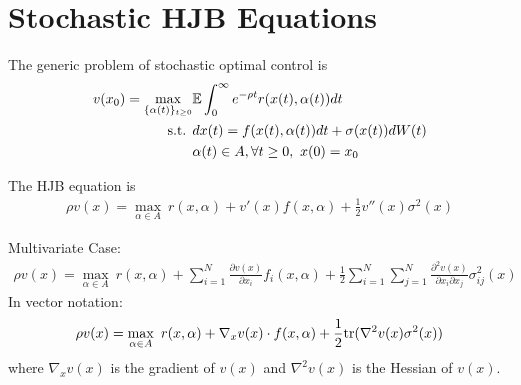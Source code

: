 \documentclass[11pt]{elegantbook}
\begin{document}
\section{Stochastic HJB Equations}
The generic problem of stochastic optimal control is
\begin{equation}
    \begin{aligned}
        v(x_0)=\max_{\{\alpha(t)\}_{t\geq 0}}&\mathbb{E}\int_0^{\infty}e^{-\rho t}r(x(t),\alpha(t))dt\\
        \textnormal{s.t. }& dx(t)=f(x(t),\alpha(t))dt+\sigma(x(t))dW(t)\\
        & \alpha(t)\in A,\forall t\geq 0,\ x(0)=x_0
    \end{aligned}
    \nonumber
\end{equation}
\begin{proposition}
    The HJB equation is
    \begin{equation}
        \begin{aligned}
            \rho v(x) = \max_{\alpha\in A}\ r(x,\alpha) + v'(x)f(x,\alpha) + \frac{1}{2}v''(x)\sigma^2(x)
        \end{aligned}
        \nonumber
    \end{equation}
\end{proposition}
Multivariate Case:
\begin{equation}
    \begin{aligned}
        \rho v(x) = \max_{\alpha\in A}\ r(x,\alpha) + \sum_{i=1}^N \frac{\partial v(x)}{\partial x_i} f_i(x,\alpha) + \frac{1}{2}\sum_{i=1}^N\sum_{j=1}^N \frac{\partial^2 v(x)}{\partial x_i \partial x_j} \sigma_{ij}^2(x)
    \end{aligned}
    \nonumber
\end{equation}
In vector notation:
\begin{equation}
    \begin{aligned}
        \rho v(x) = \max_{\alpha\in A}\ r(x,\alpha) + \nabla_x v(x) \cdot f(x,\alpha) + \frac{1}{2}\textnormal{tr}(\nabla^2v(x)\sigma^2(x))
    \end{aligned}
    \nonumber
\end{equation}
where $\nabla_x v(x)$ is the gradient of $v(x)$ and $\nabla^2v(x)$ is the Hessian of $v(x)$.
\end{document}
